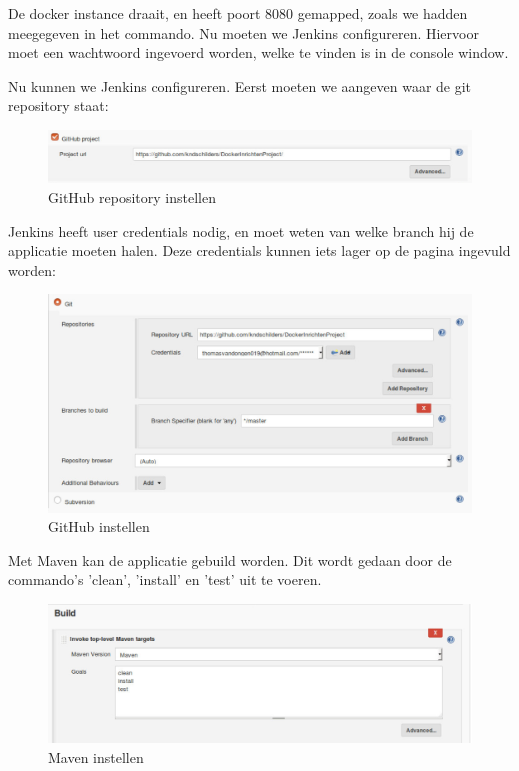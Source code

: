 \documentclass[12pt]{article}
\begin{document}
\noindent De docker instance draait, en heeft poort 8080 gemapped, zoals we hadden meegegeven in het commando. Nu moeten we Jenkins configureren. Hiervoor moet een wachtwoord ingevoerd worden, welke te vinden is in de console window.

Nu kunnen we Jenkins configureren. Eerst moeten we aangeven waar de git repository staat:

\begin{figure}[H]
	\begin{center}
		\includegraphics[width=1.0\textwidth]{images/Jenkins-Github.PNG}
		\caption{GitHub repository instellen\label{fig:jenkins_config_repo}}
	\end{center}
\end{figure}

\noindent Jenkins heeft user credentials nodig, en moet weten van welke branch hij de applicatie moeten halen. Deze credentials kunnen iets lager op de pagina ingevuld worden:

\begin{figure}[H]
	\begin{center}
		\includegraphics[width=1.0\textwidth]{images/Jenkins-Github-2.PNG}
		\caption{GitHub instellen\label{fig:jenkins_config_repo_2}}
	\end{center}
\end{figure}

\noindent Met Maven kan de applicatie gebuild worden. Dit wordt gedaan door de commando's 'clean', 'install' en 'test' uit te voeren.

\begin{figure}[H]
	\begin{center}
		\includegraphics[width=1.0\textwidth]{images/Maven.PNG}
		\caption{Maven instellen\label{fig:jenkins_maven}}
	\end{center}
\end{figure}
\end{document}
